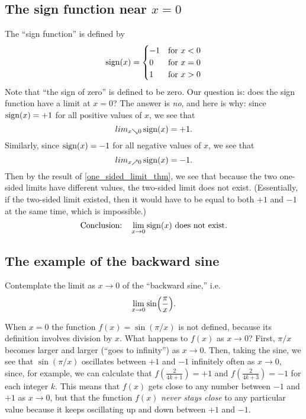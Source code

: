 \subsection{The sign function near $x=0$} 
\label{sec:sign-function-has-no-limit}
The ``sign function'' is defined by%
%
\[
\mathop{\mathrm{sign}} (x) =
\begin{cases}
  -1 & \text{for $x<0$}\\ 0 & \text{for $x=0$}\\ 1 & \text{for $x>0$}
\end{cases}
\]
Note that ``the sign of zero'' is defined to be zero.  Our question is: does the
sign function have a limit at $x=0$?  The answer is \emph{no}, and here is why:
since $\mathop{\mathrm{sign}}(x) = +1$ for all positive values of $x$, we see that
\[
 lim_{x\searrow 0} \mathop{\mathrm{sign}}(x) = +1.
\]
Similarly, since $\mathop{\mathrm{sign}}(x) = -1$ for all negative values of $x$, we see that
\[
 lim_{x\nearrow 0} \mathop{\mathrm{sign}}(x) = -1.
\]
 Then by the result of \ref{one_sided_limit_thm}, we see that because the two one-sided limits have different values, the two-sided limit does not exist.  (Essentially, if the two-sided limit existed, then it would have to be equal to both $+1$ and $-1$ at the same time, which is impossible.)
\[
\text{Conclusion:}\quad
\lim_{x\to 0} \mathop{\mathrm{sign}} (x) \text{ does not exist.}
\]
\subsection{The example of the backward sine} 
\label{sec:03backward-sine}
Contemplate the limit as $x\to0$ of the ``backward sine,'' i.e.
\[
\lim_{x\to 0}\sin \Bigl(\frac\pi x\Bigr).
\]

When $x=0$ the function $f(x)=\sin(\pi /x)$ is not defined, because its
definition involves division by $x$.  What happens to $f(x)$ as $x\to0$?
First, $\pi /x$ becomes larger and larger (``goes to infinity'') as
$x\to0$.  Then, taking the sine, we see that $ \sin(\pi /x)$ oscillates
 between $+1$ and $-1$ infinitely often as $x\to0$, since, for example, we can calculate that $f(\frac{2}{4k+1})=+1$ and $f(\frac{2}{4k+3})=-1$ for each integer $k$. This means that $f(x)$
gets close to any number between $-1$ and $+1$ as $x\to0$, but that the
function $f(x)$ \emph{never stays close} to any particular value because it
keeps oscillating up and down between $+1$ and $-1$.

